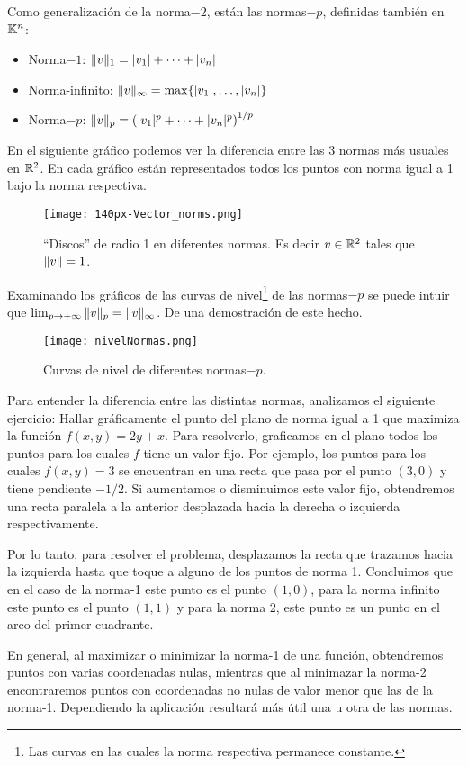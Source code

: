 \tccdefi
Como generalización de la norma$-2$, están las normas$-p$, definidas también en  $\mathbb K^{n}$:

\begin{itemize}
\item Norma$-1$: $\| \vb \|_1 = |v_1| + \dots + |v_n|$
\item Norma-infinito: $\| \vb \|_\infty = \max\{|v_1|, \dots, |v_n|\}$
\item Norma$-p$: $\| \vb \|_p = \left(|v_1|^p  + \dots + |v_n|^p \right)^{1/p}$
\end{itemize}
\etcc

En el siguiente gr\'afico podemos ver la diferencia entre las 3 normas m\'as usuales en $\mathbb R^2$. En cada gr\'afico est\'an representados todos los puntos con norma igual a 1 bajo la norma respectiva.
\clearpage
\begin{figure}
\texttt{[image: 140px-Vector\_norms.png]}
\caption{``Discos''  de radio 1 en diferentes normas. Es decir $\vb\in \R^2$ tales que $\|\vb\|=1$.}
\end{figure}
\begin{ej}
 Examinando los gráficos de las curvas de
nivel\footnote{Las curvas en las cuales la norma respectiva permanece constante.} de las normas$-p$ se puede intuir que  $\lim_{p\to +\infty}\|\vb\|_p=\|\vb\|_\infty$. De una demostración de este hecho.
\end{ej}
\begin{figure}
 \texttt{[image: nivelNormas.png]}
\caption{Curvas de nivel de diferentes normas$-p$.}
\end{figure}
\begin{aplicacion}
Para entender la diferencia entre las distintas normas, analizamos el siguiente ejercicio: Hallar gr\'aficamente el punto del plano de norma igual a 1 que maximiza la funci\'on $f(x,y) = 2y + x$. Para resolverlo, graficamos en el plano todos los puntos para los cuales $f$ tiene un valor fijo. Por ejemplo, los puntos para los cuales $f(x,y) = 3$ se encuentran en una recta que pasa por el punto $(3,0)$ y tiene pendiente $-1/2$. Si aumentamos o disminuimos este valor fijo, obtendremos una recta paralela a la anterior desplazada hacia la derecha o izquierda respectivamente.

Por lo tanto, para resolver el problema, desplazamos la recta que trazamos hacia la izquierda hasta que toque a alguno de los puntos de norma 1.
Concluimos que en el caso de la norma-1 este punto es el punto $(1,0)$, para la norma infinito este punto es el punto $(1,1)$ y para la norma 2, este punto es un punto en el arco del primer cuadrante.

En general, al maximizar o minimizar la norma-1 de una función, obtendremos puntos con varias coordenadas nulas, mientras que al minimazar la norma-2 encontraremos puntos con coordenadas no nulas de valor menor que las de la norma-1. Dependiendo la aplicación resultará m\'as \'util una u otra de las normas.
\end{aplicacion}
